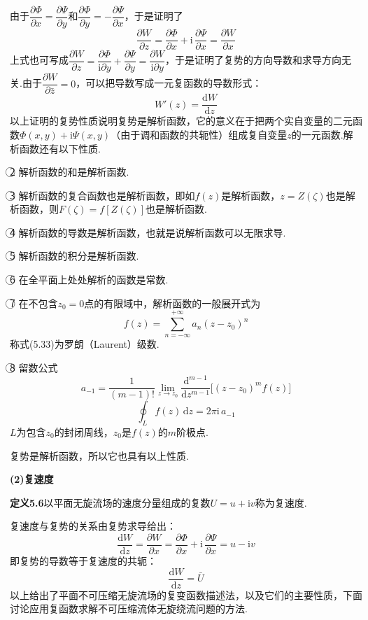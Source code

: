 由于$\dfrac{\partial\Phi}{\partial x}=\dfrac{\partial\Psi}{\partial y}$和$\dfrac{\partial\Phi}{\partial y}=-\dfrac{\partial\Psi}{\partial x}$，于是证明了
\[
\frac{\partial W}{\partial z}=\frac{\partial\Phi}{\partial x}+\mathrm{i}\,\frac{\partial\Psi}{\partial x}=\frac{\partial W}{\partial x}
\]
上式也可写成$\dfrac{\partial W}{\partial z}=\dfrac{\partial\Phi}{\mathrm{i}\partial y}+\dfrac{\partial\Psi}{\partial y}=\dfrac{\partial W}{\mathrm{i}\partial y}$，于是证明了复势的方向导数和求导方向无关.由于$\dfrac{\partial W}{\partial\bar{z}}=0$，可以把导数写成一元复函数的导数形式：
\[
W'(z)=\frac{\mathrm{d}W}{\mathrm{d}z}
\]
以上证明的复势性质说明复势是解析函数，它的意义在于把两个实自变量的二元函数$\Phi(x,y)+\mathrm{i}\Psi(x,y)$（由于调和函数的共轭性）组成复自变量$z$的一元函数.解析函数还有以下性质.

\textcircled{2} 解析函数的和是解析函数.

\textcircled{3} 解析函数的复合函数也是解析函数，即如$f(z)$是解析函数，$z=Z(\zeta)$也是解析函数，则$F(\zeta)=f[Z(\zeta)]$也是解析函数.

\textcircled{4} 解析函数的导数是解析函数，也就是说解析函数可以无限求导.

\textcircled{5} 解析函数的积分是解析函数.

\textcircled{6} 在全平面上处处解析的函数是常数.

\textcircled{7} 在不包含$z_0=0$点的有限域中，解析函数的一般展开式为
\begin{equation*}
f(z)=\sum_{n=-\infty}^{+\infty}a_n(z-z_0)^{n}
\tag{5.33}
\end{equation*}
称式(5.33)为罗朗（Laurent）级数.

\textcircled{8} 留数公式
\begin{equation*}
a_{-1}=\frac{1}{(m-1)!}\lim_{z\to z_0}\frac{\mathrm{d}^{m-1}}{\mathrm{d}z^{m-1}}\big[(z-z_0)^{m}f(z)\big]
\tag{5.34a}
\end{equation*}
\begin{equation*}
\oint_L f(z)\,\mathrm{d}z=2\pi\mathrm{i}\,a_{-1}
\tag{5.34b}
\end{equation*}
$L$为包含$z_0$的封闭周线，$z_0$是$f(z)$的$m$阶极点.

复势是解析函数，所以它也具有以上性质.

\textbf{(2)复速度}

\noindent\textbf{定义5.6}\quad 以平面无旋流场的速度分量组成的复数$U=u+\mathrm{i}v$称为复速度.

复速度与复势的关系由复势求导给出：
\[
\frac{\mathrm{d}W}{\mathrm{d}z}=\frac{\partial W}{\partial x}=\frac{\partial\Phi}{\partial x}+\mathrm{i}\,\frac{\partial\Psi}{\partial x}=u-\mathrm{i}v
\]
即复势的导数等于复速度的共轭：
\begin{equation*}
\frac{\mathrm{d}W}{\mathrm{d}z}=\bar{U}
\tag{5.35}
\end{equation*}
以上给出了平面不可压缩无旋流场的复变函数描述法，以及它们的主要性质，下面讨论应用复函数求解不可压缩流体无旋绕流问题的方法.


